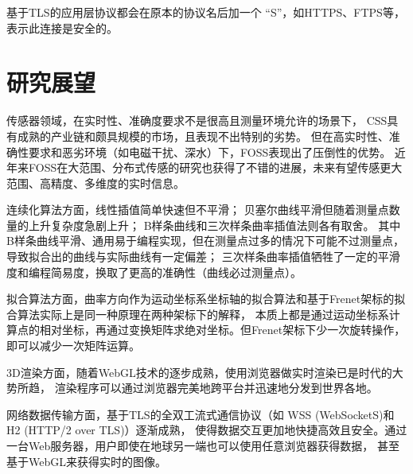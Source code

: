 基于TLS的应用层协议都会在原本的协议名后加一个 “S”，如HTTPS、FTPS等，表示此连接是安全的。

\section{研究展望}

传感器领域，在实时性、准确度要求不是很高且测量环境允许的场景下，
CSS具有成熟的产业链和颇具规模的市场，且表现不出特别的劣势。
但在高实时性、准确性要求和恶劣环境（如电磁干扰、深水）下，FOSS表现出了压倒性的优势。
近年来FOSS在大范围、分布式传感的研究也获得了不错的进展，未来有望传感更大范围、高精度、多维度的实时信息。

连续化算法方面，线性插值简单快速但不平滑；
贝塞尔曲线平滑但随着测量点数量的上升复杂度急剧上升；
B样条曲线和三次样条曲率插值法则各有取舍。
其中B样条曲线平滑、通用易于编程实现，但在测量点过多的情况下可能不过测量点，导致拟合出的曲线与实际曲线有一定偏差；
三次样条曲率插值牺牲了一定的平滑度和编程简易度，换取了更高的准确性（曲线必过测量点）。

拟合算法方面，曲率方向作为运动坐标系坐标轴的拟合算法和基于Frenet架标的拟合算法实际上是同一种原理在两种架标下的解释，
本质上都是通过运动坐标系计算点的相对坐标，再通过变换矩阵求绝对坐标。但Frenet架标下少一次旋转操作，即可以减少一次矩阵运算。

3D渲染方面，随着WebGL技术的逐步成熟，使用浏览器做实时渲染已是时代的大势所趋，
渲染程序可以通过浏览器完美地跨平台并迅速地分发到世界各地。

网络数据传输方面，基于TLS的全双工流式通信协议（如 WSS (WebSocketS)和 H2 (HTTP/2 over TLS)）逐渐成熟，
使得数据交互更加地快捷高效且安全。通过一台Web服务器，用户即使在地球另一端也可以使用任意浏览器获得数据，
甚至基于WebGL来获得实时的图像。

\newpage
\printbibliography[title={参考文献}]
